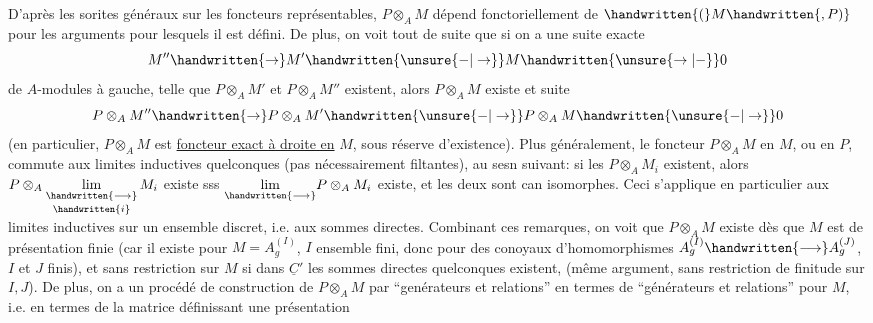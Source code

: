 D'après les sorites généraux sur les foncteurs représentables, $P\otimes_A M$
dépend fonctoriellement de $\handwritten{(}M\handwritten{,P)}$   pour les arguments pour
lesquels il est défini. De plus, on voit tout de suite que si on a une
suite exacte
\[
M''\handwritten{\to}M'\handwritten{\unsure{-|\to}}M\handwritten{\unsure{\to|-}}0
\]
de $A$-modules à gauche, telle que $P\otimes_A M'$ et $P\otimes_A M''$ existent, alors $P\otimes_A M$
existe et  suite 
\[
P\otimes_A M''\handwritten{\to}P\otimes_A M'\handwritten{\unsure{-|\to}}P\otimes_A M\handwritten{\unsure{-|\to}}0
\]
 (en particulier, $P\otimes_A M$ est \uline{foncteur exact à droite en} $M$, sous réserve
d'existence).
 Plus généralement, le foncteur
$P\otimes_A M$ en $M$, ou en $P$, commute aux limites inductives quelconques (pas nécessairement filtantes), au sesn suivant: si les $P\otimes_A M_i$ existent, 
alors $P\otimes_A\mathop{\underset{\handwritten{\longrightarrow}}{\lim}}\limits_{\handwritten{i}}M_i$ existe sss $\underset{\handwritten{\longrightarrow}}{\lim}P\otimes_A M_i$ existe, et les deux sont can isomorphes. Ceci s'applique en particulier aux limites inductives sur un ensemble discret, i.e. aux sommes directes.
Combinant ces remarques, on voit
que $P\otimes_A M$ existe  dès que $M$ est de présentation finie (car il
existe pour $M=A_g^{(I)}$, $I$ ensemble fini, donc pour des conoyaux d'homomorphismes $A_g^{(I)}\handwritten{\longrightarrow}A_g^{(J)}$, $I$ et $J$ finis), et sans restriction sur $M$ si dans $\underline C'$
les sommes directes quelconques existent, (même argument, sans restriction
de finitude sur $I,J$). De plus, on a un procédé de construction de $P\otimes_A M$
par ``genérateurs et relations'' en termes de ``générateurs et relations''
pour $M$, i.e. en termes  de la matrice définissant une présentation
